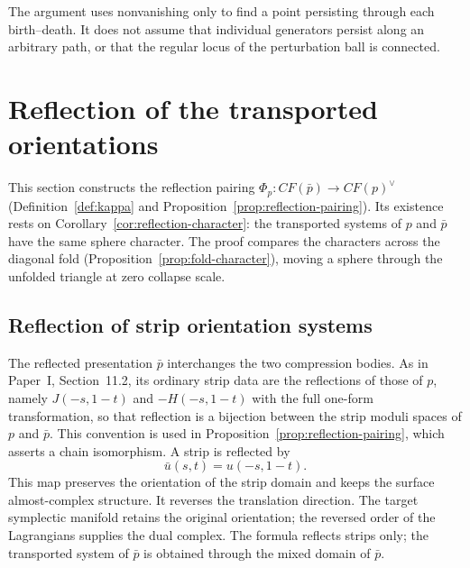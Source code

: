 \documentclass[11pt]{amsart}
\theoremstyle{definition}
\theoremstyle{remark}
\theoremstyle{plain}
\numberwithin{equation}{section}
\newcommand{\CF}{\mathit{CF}}
\begin{document}
The argument uses nonvanishing only to
find a point persisting through each
birth--death. It does not assume that
individual generators persist along an
arbitrary path, or that the regular
locus of the perturbation ball is
connected.

\section{Reflection of the transported orientations}
\label{sec:reflection}

This section constructs the reflection pairing
$\Phi_p:\CF(\bar p)\to\CF(p)^\vee$ (Definition~\ref{def:kappa} and
Proposition~\ref{prop:reflection-pairing}). Its existence rests on
Corollary~\ref{cor:reflection-character}: the transported systems of
$p$ and $\bar p$ have the same sphere character. The proof compares
the characters across the diagonal fold
(Proposition~\ref{prop:fold-character}), moving a sphere through the
unfolded triangle at zero collapse scale.

\subsection{Reflection of strip orientation systems}
The reflected presentation $\bar p$
interchanges the two compression bodies.
As in Paper~I, Section~11.2, its ordinary
strip data are the reflections of those of
$p$, namely $J(-s,1-t)$ and $-H(-s,1-t)$ with
the full one-form transformation, so that
reflection is a bijection between the strip
moduli spaces of $p$ and $\bar p$. This
convention is used in
Proposition~\ref{prop:reflection-pairing},
which asserts a chain isomorphism.
A strip is reflected by
\[
 \bar u(s,t)=u(-s,1-t).
\]
This map preserves the orientation of the
strip domain and keeps the surface
almost-complex structure. It reverses
the translation direction. The target
symplectic manifold retains the original
orientation; the reversed order of the
Lagrangians supplies the dual complex.
The formula reflects strips only; the
transported system of $\bar p$ is
obtained through the mixed domain of
$\bar p$.
\end{document}
